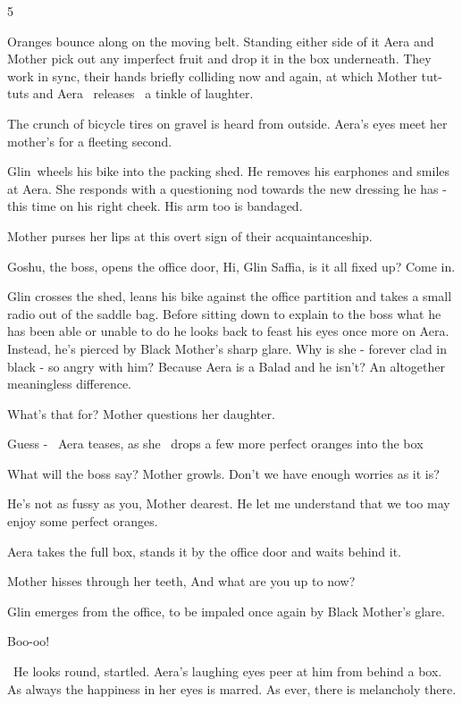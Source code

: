 \documentclass[12pt]{book}
\begin{document}
5

Oranges bounce along on the moving belt. Standing either side of it Aera and Mother pick out any imperfect fruit and
drop it in the box underneath. They work in sync, their hands briefly colliding now and again, at which Mother tut-tuts
and Aera \ releases \ a tinkle of laughter.

The crunch of bicycle tires on gravel is heard from outside. Aera's eyes meet her mother's for a fleeting second.

Glin~wheels his bike into the packing shed. He removes his earphones and smiles at Aera. She responds with a questioning
nod towards the new dressing he has - this time on his right cheek. His arm too is bandaged.

Mother purses her lips at this overt sign of their acquaintanceship.~~~~~~~

Goshu, the boss, opens the office door, {\textquotedbl}Hi, Glin Saffia, is it all fixed up? Come in.{\textquotedbl}

Glin crosses the shed, leans his bike against the office partition and takes a small radio out of the saddle bag. Before
sitting down to explain to the boss what he has been able or unable to do he looks back to feast his eyes once more on
Aera. Instead, he's pierced by Black Mother's sharp glare. Why is she - forever clad in black - so angry with him?
Because Aera is a Balad and he isn't? An altogether meaningless difference.

{\textquotedbl}What's that for?{\textquotedbl} Mother questions her daughter.

{\textquotedbl}Guess -{\textquotedbl}~ Aera teases, as she \ drops a few more perfect oranges into the box

{\textquotedbl}What will the boss say?{\textquotedbl} Mother growls. {\textquotedbl}Don't we have enough worries as it
is?{\textquotedbl}

{\textquotedbl}He's not as fussy as you, Mother dearest. He let me understand that we too may enjoy some perfect
oranges.{\textquotedbl}

Aera takes the full box, stands it by the office door and waits behind it.

Mother hisses through her teeth, {\textquotedbl}And what are you up to now?{\textquotedbl}

Glin emerges from the office, to be impaled once again by Black Mother's glare.

{\textquotedbl}Boo-oo!{\textquotedbl}

~He looks round, startled. Aera's laughing eyes peer at him from behind a box. As always the happiness in her eyes is
marred. As ever, there is melancholy there.
\end{document}
